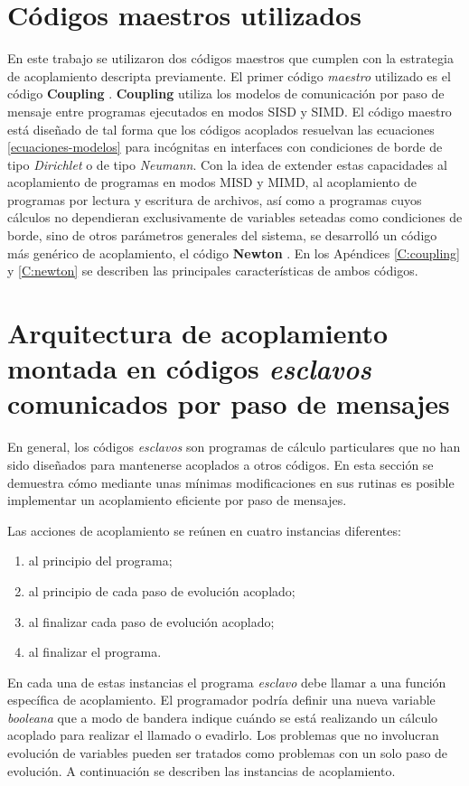 \section{Códigos maestros utilizados}
\label{2:maestros}

En este trabajo se utilizaron dos códigos maestros que cumplen con la estrategia de acoplamiento descripta previamente.
El primer código \textit{maestro} utilizado es el código \textbf{Coupling} \cite{coup-0d3d} \cite{coup-black} \cite{coup-hyd}.
\textbf{Coupling} utiliza los modelos de comunicación por paso de mensaje entre programas ejecutados en modos SISD y SIMD.
El código maestro está diseñado de tal forma que los códigos acoplados resuelvan las ecuaciones \ref{ecuaciones-modelos}
para incógnitas en interfaces con condiciones de borde de tipo \textit{Dirichlet} o de tipo \textit{Neumann}.
Con la idea de extender estas capacidades al acoplamiento de programas en modos MISD y MIMD,
al acoplamiento de programas por lectura y escritura de archivos,
así como a programas cuyos cálculos no dependieran exclusivamente de variables seteadas como condiciones de borde,
sino de otros parámetros generales del sistema,
se desarrolló un código más genérico de acoplamiento, el código \textbf{Newton} \cite{newton}.
En los Apéndices \ref{C:coupling} y \ref{C:newton} se describen las principales características de ambos códigos.

\section{Arquitectura de acoplamiento montada en códigos \textit{esclavos} comunicados por paso de mensajes}
\label{2:arquitectura-mpi}

En general, los códigos \textit{esclavos} son programas de cálculo particulares que no han sido diseñados para mantenerse acoplados a otros códigos.
En esta sección se demuestra cómo mediante unas mínimas modificaciones en sus rutinas es posible implementar un acoplamiento eficiente por paso de mensajes.

Las acciones de acoplamiento se reúnen en cuatro instancias diferentes:
\begin{enumerate}
\item al principio del programa;
\item al principio de cada paso de evolución acoplado;
\item al finalizar cada paso de evolución acoplado;
\item al finalizar el programa.
\end{enumerate}
En cada una de estas instancias el programa \textit{esclavo} debe llamar a una función específica de acoplamiento.
El programador podría definir una nueva variable \textit{booleana} que a modo de bandera indique cuándo se está realizando un cálculo acoplado para realizar el llamado o evadirlo.
Los problemas que no involucran evolución de variables pueden ser tratados como problemas con un solo paso de evolución.
A continuación se describen las instancias de acoplamiento.

